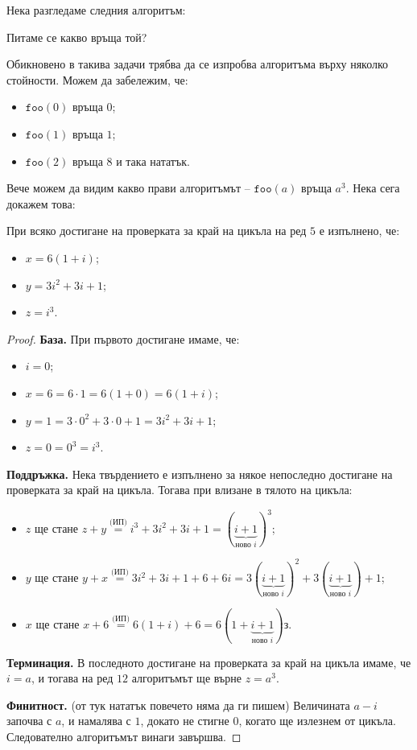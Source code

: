 Нека разгледаме следния алгоритъм:

Питаме се какво връща той?

Обикновено в такива задачи трябва да се изпробва алгоритъма върху няколко стойности.
Можем да забележим, че:
\begin{itemize}
    \item $\mathtt{foo}(0)$ връща $0$;
    \item $\mathtt{foo}(1)$ връща $1$;
    \item $\mathtt{foo}(2)$ връща $8$ и така нататък.
\end{itemize}

Вече можем да видим какво прави алгоритъмът -- $\mathtt{foo}(a)$ връща $a^3$.
Нека сега докажем това:
\begin{invariant}
    При всяко достигане на проверката за край на цикъла на ред $5$ е изпълнено, че:
    \begin{itemize}
        \item $x = 6 (1 + i)$;
        \item $y = 3i^2 + 3i + 1$;
        \item $z = i^3$.
    \end{itemize}
\end{invariant}
\begin{proof}
    \phantom{1}

    \textbf{База.}
    При първото достигане имаме, че:
    \begin{itemize}
        \item $i = 0$;
        \item $x = 6 = 6 \cdot 1 = 6 (1 + 0) = 6 (1 + i)$;
        \item $y = 1 = 3 \cdot 0^2 + 3 \cdot 0 + 1 = 3i^2 + 3i + 1$;
        \item $z = 0 = 0^3 = i^3$.
    \end{itemize}

    \textbf{Поддръжка.}
    Нека твърдението е изпълнено за някое непоследно достигане на проверката за край на цикъла.
    Тогава при влизане в тялото на цикъла:
    \begin{itemize}
        \item $z$ ще стане $z + y \stackrel{\text{(ИП)}}{=} i^3 + 3i^2 + 3i + 1 = (\underbrace{i + 1}_{\text{ново } i})^3$;
        \item $y$ ще стане $y + x \stackrel{\text{(ИП)}}{=} 3i^2 + 3i + 1 + 6 + 6i = 3(\underbrace{i + 1}_{\text{ново } i})^2 + 3(\underbrace{i + 1}_{\text{ново } i}) + 1$;
        \item $x$ ще стане $x + 6 \stackrel{\text{(ИП)}}{=} 6(1 + i) + 6 = 6(1 + \underbrace{i + 1}_{\text{ново } i})з$.
    \end{itemize}

    \textbf{Терминация.}
    В последното достигане на проверката за край на цикъла имаме, че $i = a$, и тогава на ред $12$ алгоритъмът ще върне $z = a^3$.

    \textbf{Финитност.} (от тук нататък повечето няма да ги пишем)
    Величината $a - i$ започва с $a$, и намалява с $1$, докато не стигне $0$, когато ще излезнем от цикъла.
    Следователно алгоритъмът винаги завършва.
\end{proof}


